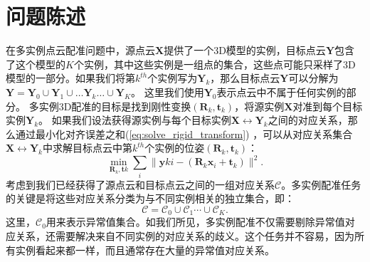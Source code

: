 %
%
%
%
%
%


\chapter{问题陈述}


在多实例点云配准问题中，源点云$\mathbf{X}$提供了一个3D模型的实例，目标点云$\mathbf{Y}$包含了这个模型的$K$个实例，其中这些实例是一组点的集合，这些点可能只采样了3D模型的一部分。如果我们将第$k^{th}$个实例写为$\mathbf{Y}_k$，那么目标点云$\mathbf{Y}$可以分解为$
\mathbf{Y} = \mathbf{Y}_0 \cup \mathbf{Y}_1 \cup \ldots \mathbf{Y}_k \ldots \cup \mathbf{Y}_K$。
这里我们使用$\mathbf{Y}_0$表示点云中不属于任何实例的部分。
多实例3D配准的目标是找到刚性变换$(\mathbf{R}_k, \mathbf{t}_k)$，将源实例$\mathbf{X}$对准到每个目标实例$\mathbf{Y}_k$。
如果我们设法获得源实例与每个目标实例$\mathbf{X} \leftrightarrow \mathbf{Y}_k$之间的对应关系，那么通过最小化对齐误差之和(\ref{eq:solve_rigid_transform}) \cite{SVD}，可以从对应关系集合$\mathbf{X}\leftrightarrow \mathbf{Y}_k$中求解目标点云中第$k^{th}$个实例的位姿$(\mathbf{R}_k, \mathbf{t}_k)$：
\begin{equation}
\underset{\mathbf{R}_k,\mathbf{t}k}{\min}\sum_i{\parallel}\mathbf{y}{ki}-(\mathbf{R}_k\mathbf{x}_i+\mathbf{t}_k)\parallel ^2.
\label{eq:solve_rigid_transform}
\end{equation}
考虑到我们已经获得了源点云和目标点云之间的一组对应关系$\mathcal{C}$。多实例配准任务的关键是将这些对应关系分类为与不同实例相关的独立集合，即：
\begin{equation}
\mathcal{C} = \mathcal{C}_0 \cup \mathcal{C}_1\cdots \cup \mathcal{C}_K.
\end{equation}
这里，$\mathcal{C}_0$用来表示异常值集合。如我们所见，多实例配准不仅需要剔除异常值对应关系，还需要解决来自不同实例的对应关系的歧义。这个任务并不容易，因为所有实例看起来都一样，而且通常存在大量的异常值对应关系。










